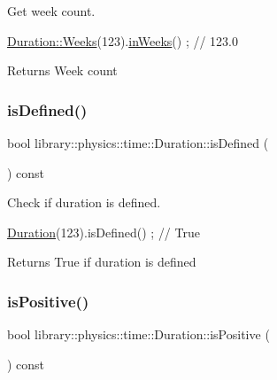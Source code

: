 Get week count. 


\begin{DoxyCode}
\hyperlink{classlibrary_1_1physics_1_1time_1_1_duration_ae9d507f6cbb36902529b28d3721507c1}{Duration::Weeks}(123).\hyperlink{classlibrary_1_1physics_1_1time_1_1_duration_ae49243cf87ccf07693b65e7170642b65}{inWeeks}() ; \textcolor{comment}{// 123.0}
\end{DoxyCode}


\begin{DoxyReturn}{Returns}
Week count 
\end{DoxyReturn}
\mbox{\label{classlibrary_1_1physics_1_1time_1_1_duration_af6ee4c1644a1cafc96d670e576dc6749}} 
\subsubsection{\texorpdfstring{is\+Defined()}{isDefined()}}
{\footnotesize\ttfamily bool library\+::physics\+::time\+::\+Duration\+::is\+Defined (\begin{DoxyParamCaption}{ }\end{DoxyParamCaption}) const}



Check if duration is defined. 


\begin{DoxyCode}
\hyperlink{classlibrary_1_1physics_1_1time_1_1_duration_a0a70efcf487a841da572afcf00001f64}{Duration}(123).isDefined() ; \textcolor{comment}{// True}
\end{DoxyCode}


\begin{DoxyReturn}{Returns}
True if duration is defined 
\end{DoxyReturn}
\mbox{\label{classlibrary_1_1physics_1_1time_1_1_duration_a443d719fb2acf922cc80a8f2be441fa1}} 
\subsubsection{\texorpdfstring{is\+Positive()}{isPositive()}}
{\footnotesize\ttfamily bool library\+::physics\+::time\+::\+Duration\+::is\+Positive (\begin{DoxyParamCaption}{ }\end{DoxyParamCaption}) const}



